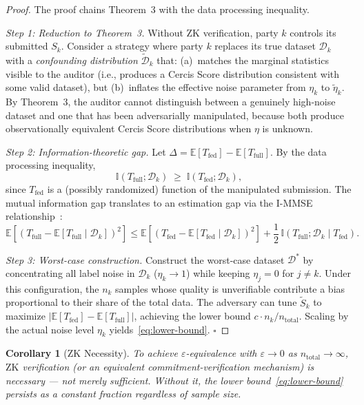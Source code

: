 \documentclass[12pt,a4paper]{article}
\newtheorem{corollary}[theorem]{Corollary}
\newcommand{\E}{\mathbb{E}}
\newcommand{\I}{\mathbb{I}}
\newcommand{\cD}{\mathcal{D}}
\newcommand{\ZK}{\mathrm{ZK}}
\begin{document}
\begin{proof}
The proof chains Theorem~3 with the data processing inequality.

\textit{Step 1: Reduction to Theorem~3.}
Without $\ZK$ verification, party $k$ controls its submitted $S_k$.  Consider
a strategy where party $k$ replaces its true dataset $\cD_k$ with a
\emph{confounding distribution} $\tilde{\cD}_k$ that: (a)~matches the
marginal statistics visible to the auditor (i.e., produces a Cercis Score
distribution consistent with some valid dataset), but (b)~inflates the
effective noise parameter from $\eta_k$ to $\tilde{\eta}_k$.  By Theorem~3,
the auditor cannot distinguish between a genuinely high-noise dataset and
one that has been adversarially manipulated, because both produce
observationally equivalent Cercis Score distributions when $\eta$ is unknown.

\textit{Step 2: Information-theoretic gap.}
Let $\Delta = \E[T_{\mathrm{fed}}] - \E[T_{\mathrm{full}}]$.  By the data
processing inequality,
\begin{equation}\label{eq:dpi}
    \I(T_{\mathrm{full}}; \cD_k) \;\geq\; \I(T_{\mathrm{fed}}; \cD_k),
\end{equation}
since $T_{\mathrm{fed}}$ is a (possibly randomized) function of the
manipulated submission.  The mutual information gap translates to an
estimation gap via the I-MMSE relationship~\citep{guo2005mutual}:
\begin{equation}\label{eq:immse}
    \E[(T_{\mathrm{full}} - \E[T_{\mathrm{full}} \mid \cD_k])^2]
    \leq \E[(T_{\mathrm{fed}} - \E[T_{\mathrm{fed}} \mid \cD_k])^2]
    + \frac{1}{2}\,\I(T_{\mathrm{full}}; \cD_k \mid T_{\mathrm{fed}}).
\end{equation}

\textit{Step 3: Worst-case construction.}
Construct the worst-case dataset $\cD^*$ by concentrating all label noise in
$\cD_k$ ($\eta_k \to 1$) while keeping $\eta_j = 0$ for $j \neq k$.  Under
this configuration, the $n_k$ samples whose quality is unverifiable contribute
a bias proportional to their share of the total data.  The adversary can tune
$\tilde{S}_k$ to maximize $|\E[T_{\mathrm{fed}}] - \E[T_{\mathrm{full}}]|$,
achieving the lower bound $c \cdot n_k / n_{\mathrm{total}}$.  Scaling by
the actual noise level $\eta_k$ yields~\eqref{eq:lower-bound}.  $\square$
\end{proof}

\begin{corollary}[ZK Necessity]
\label{cor:zk-necessity}
To achieve $\varepsilon$-equivalence with $\varepsilon \to 0$ as
$n_{\mathrm{total}} \to \infty$, $\ZK$ verification (or an equivalent
commitment-verification mechanism) is \emph{necessary} — not merely
sufficient.  Without it, the lower bound~\eqref{eq:lower-bound} persists
as a constant fraction regardless of sample size.
\end{corollary}
\end{document}
